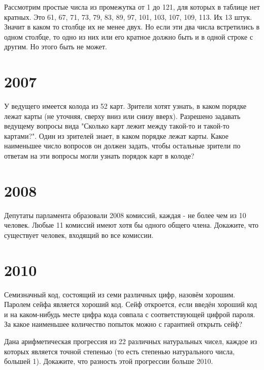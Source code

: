 \documentclass[11pt, a4paper]{template}
\begin{document}
\begin{solution}
Рассмотрим простые числа из промежутка от 1 до 121, для которых в таблице нет кратных. Это 61, 67, 71, 73, 79, 83, 89, 97, 101, 103, 107, 109, 113. Их 13 штук. Значит в каком то столбце их не менее двух. Но если эти два числа встретились в одном столбце, то одно из них или его кратное должно быть и в одной строке с другим. Но этого быть не может.  
\end{solution}

\chapter{2007}

\begin{exercise}[M2033]
У ведущего имеется колода из 52 карт. Зрители хотят узнать, в каком порядке лежат карты (не уточняя, сверху вниз или снизу вверх). Разрешено задавать ведущему вопросы вида "Сколько карт лежит между такой-то и такой-то картами?". Один из зрителей знает, в каком порядке лежат карты. Какое наименьшее число вопросов он должен задать, чтобы остальные зрители по ответам на эти вопросы могли узнать порядок карт в колоде?
\end{exercise}

\chapter{2008}

\begin{exercise}[M2096]
Депутаты парламента образовали 2008 комиссий, каждая - не более чем из 10 человек. Любые 11 комиссий имеют хотя бы одного общего члена. Докажите, что существует человек, входящий во все комиссии.
\end{exercise}



\chapter{2010}

\begin{exercise}[M2162]
Семизначный код, состоящий из семи различных цифр, назовём хорошим. Паролем сейфа является хороший код. Сейф откроется, если введён хороший код и на каком-нибудь месте цифра кода совпала с соответствующей цифрой пароля. За какое наименьшее количество попыток можно с гарантией открыть сейф?
\end{exercise}

\begin{exercise}[2202]
Дана арифметическая прогрессия из 22 различных натуральных чисел, каждое из которых является точной степенью (то есть степенью натурального числа, большей 1). Докажите, что разность этой прогрессии больше 2010.
\end{exercise}
\end{document}
